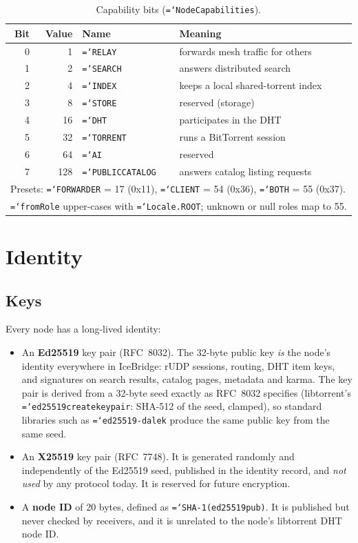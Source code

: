 \documentclass[11pt,a4paper]{article}
\newcommand{\code}[1]{\texttt{\hyphenchar\font=`\-\relax #1}}
\DeclareRobustCommand{\_}{\origunderscore\allowbreak}
\begin{document}
\begin{table}[ht]
\centering\small
\begin{tabular}{rrll}
\toprule
Bit & Value & Name & Meaning\\
\midrule
0 & 1 & \code{RELAY} & forwards mesh traffic for others\\
1 & 2 & \code{SEARCH} & answers distributed search\\
2 & 4 & \code{INDEX} & keeps a local shared-torrent index\\
3 & 8 & \code{STORE} & reserved (storage)\\
4 & 16 & \code{DHT} & participates in the DHT\\
5 & 32 & \code{TORRENT} & runs a BitTorrent session\\
6 & 64 & \code{AI} & reserved\\
7 & 128 & \code{PUBLIC\_CATALOG} & answers catalog listing requests\\
\midrule
\multicolumn{4}{l}{Presets: \code{FORWARDER} = 17 (0x11), \code{CLIENT} = 54 (0x36), \code{BOTH} = 55 (0x37).}\\
\multicolumn{4}{l}{\code{fromRole} upper-cases with \code{Locale.ROOT}; unknown or null roles map to 55.}\\
\bottomrule
\end{tabular}
\caption{Capability bits (\code{NodeCapabilities}).}
\label{tab:caps}
\end{table}

\section{Identity}
\label{sec:identity}

\subsection{Keys}
Every node has a long-lived identity:
\begin{itemize}
\item An \textbf{Ed25519} key pair (RFC~8032). The 32-byte public key \emph{is} the node's
  identity everywhere in IceBridge: rUDP sessions, routing, DHT item keys, and signatures on
  search results, catalog pages, metadata and karma.
  The key pair is derived from a 32-byte seed exactly as RFC~8032 specifies (libtorrent's
  \code{ed25519\_create\_keypair}: SHA-512 of the seed, clamped), so standard libraries such
  as \code{ed25519-dalek} produce the same public key from the same seed.
\item An \textbf{X25519} key pair (RFC~7748). It is generated randomly and independently of
  the Ed25519 seed, published in the identity record, and \emph{not used} by any protocol
  today. It is reserved for future encryption.
\item A \textbf{node ID} of 20 bytes, defined as \code{SHA-1(ed25519\_pub)}. It is
  published but never checked by receivers, and it is unrelated to the node's libtorrent
  DHT node ID.
\end{itemize}
\end{document}

